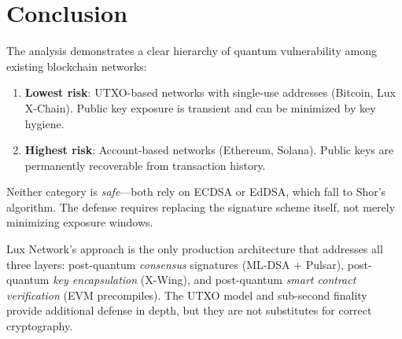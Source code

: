\section{Conclusion}


The analysis demonstrates a clear hierarchy of quantum vulnerability
among existing blockchain networks:

\begin{enumerate}[nosep]
  \item \textbf{Lowest risk}: UTXO-based networks with single-use
        addresses (Bitcoin, Lux X-Chain). Public key exposure is
        transient and can be minimized by key hygiene.
  \item \textbf{Highest risk}: Account-based networks (Ethereum,
        Solana). Public keys are permanently recoverable from
        transaction history.
\end{enumerate}

Neither category is \emph{safe}---both rely on ECDSA or EdDSA,
which fall to Shor's algorithm. The defense requires replacing the
signature scheme itself, not merely minimizing exposure windows.

Lux Network's approach is the only production architecture that
addresses all three layers: post-quantum \emph{consensus} signatures
(ML-DSA + Pulsar), post-quantum \emph{key encapsulation} (X-Wing),
and post-quantum \emph{smart contract verification} (EVM precompiles).
The UTXO model and sub-second finality provide additional defense in
depth, but they are not substitutes for correct cryptography.

